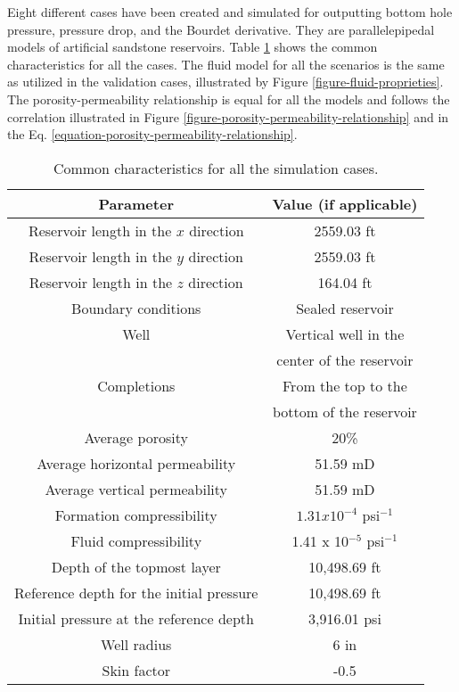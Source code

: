 Eight different cases have been created and simulated for outputting bottom hole pressure, pressure drop, and the Bourdet derivative.
%
They are parallelepipedal models of artificial sandstone reservoirs.
%
Table \ref{table-common-characteristics-for-simulation-cases} shows the common characteristics for all the cases.
%
The fluid model for all the scenarios is the same as utilized in the validation cases, illustrated by Figure \ref{figure-fluid-proprieties}.
%
The porosity-permeability relationship is equal for all the models and follows the correlation illustrated in Figure \ref{figure-porosity-permeability-relationship} and in the Eq. \ref{equation-porosity-permeability-relationship}.
%
\begin{table}[htbp]
	\centering
	\caption{Common characteristics for all the simulation cases.}
	\begin{tabular}{c c}
		\toprule
		Parameter & Value (if applicable)\\
		\midrule
		Reservoir length in the $x$ direction & 2559.03 ft\\
		Reservoir length in the $y$ direction & 2559.03 ft\\
		Reservoir length in the $z$ direction & 164.04 ft\\
		Boundary conditions & Sealed reservoir \\
		Well & Vertical well in the\\
		& center of the reservoir\\
		Completions & From the top to the\\
		& bottom of the reservoir\\
		Average porosity & 20\%\\
		Average horizontal permeability & 51.59 mD\\
		Average vertical permeability & 51.59 mD\\
		Formation compressibility & $1.31 x 10^{-4}$ psi$^{-1}$\\
		Fluid compressibility &  1.41 x 10$^{-5}$ psi$^{-1}$\\
		Depth of the topmost layer & 10,498.69 ft\\
		Reference depth for the initial pressure & 10,498.69 ft\\
		Initial pressure at the reference depth & 3,916.01 psi\\
		Well radius & 6 in\\
		Skin factor & -0.5\\
		\bottomrule
	\end{tabular}
	\label{table-common-characteristics-for-simulation-cases}
\end{table}
